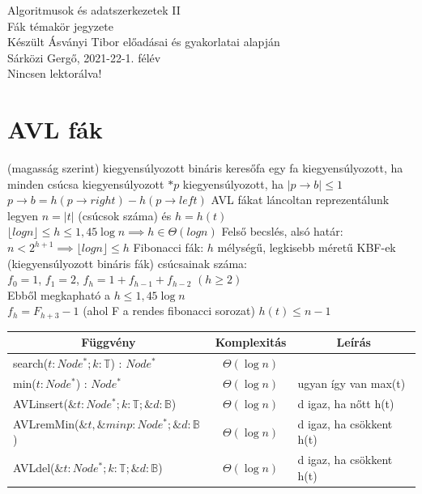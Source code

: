 \documentclass[12pt,a4paper]{article}
\begin{document}
\begin{center}
	\huge
	Algoritmusok és adatszerkezetek II\\
	\vspace{1mm}
	\LARGE
	Fák témakör jegyzete\\
	\vspace{5mm}
	\large
	Készült Ásványi Tibor előadásai és gyakorlatai alapján\\
	\vspace{5mm}
	Sárközi Gergő, 2021-22-1. félév\\
	Nincsen lektorálva!
\end{center}

\tableofcontents

\pagebreak

\section{AVL fák}

\begin{outline}
	\1 (magasság szerint) kiegyensúlyozott bináris keresőfa
		\2 egy fa kiegyensúlyozott, ha minden csúcsa kiegyensúlyozott
		\2 $*p$ kiegyensúlyozott, ha $|p\to b|\le1$
		\2 $p\to b = h(p\to right) - h(p\to left)$
	\1 AVL fákat láncoltan reprezentálunk
	\1 legyen $n=|t|$ (csúcsok száma) és $h=h(t)$
	\1 $ \lfloor log n \rfloor \le h \le 1,45 \log n \implies h \in \Theta(log n) $
		\2 Felső becslés, alsó határ: $n<2^{h+1} \implies \lfloor log n \rfloor \le h$
		\2 Fibonacci fák: $h$ mélységű, legkisebb méretű KBF-ek (kiegyensúlyozott bináris fák) csúcsainak száma: \\
		$f_0=1$, $f_1=2$, $f_h=1+f_{h-1}+f_{h-2}$ $(h\ge2)$ \\
		Ebből megkapható a $h \le 1,45 \log n$ \\
		$f_h = F_{h+3}-1$ (ahol F a rendes fibonacci sorozat)
	\1 $h(t) \le n-1$
\end{outline}

\begin{table}[h!]
\centering
\begin{tabular}{|l|c|l|}
	\hline
	\multicolumn{1}{|c|}{Függvény} & \multicolumn{1}{|c|}{Komplexitás} & \multicolumn{1}{|c|}{Leírás} \\
	\hline
	search($t:Node^*; k:\mathbb{T}$) : $Node^*$ & $\Theta(\log n)$ & \\
	\hline
	min($t:Node^*$) : $Node^*$ & $\Theta(\log n)$ & ugyan így van max(t) \\
	\hline
	AVLinsert($\&t:Node^*; k:\mathbb{T}; \&d:\mathbb{B}$) & $\Theta(\log n)$ & d igaz, ha nőtt h(t) \\
	\hline
	AVLremMin($\&t,\&minp:Node^*; \&d:\mathbb{B}$) & $\Theta(\log n)$ & d igaz, ha csökkent h(t) \\
	\hline
	AVLdel($\&t:Node^*; k:\mathbb{T}; \&d:\mathbb{B}$) & $\Theta(\log n)$ & d igaz, ha csökkent h(t) \\
	\hline
\end{tabular}
\end{table}
\end{document}
